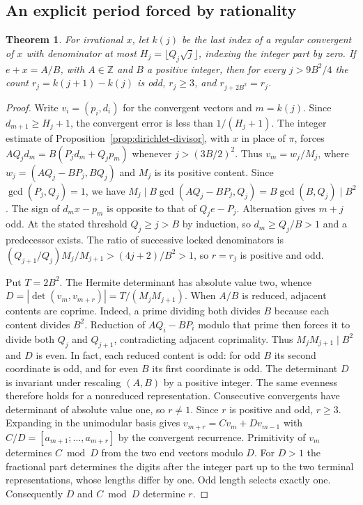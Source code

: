 \documentclass[11pt]{amsart}
\newtheorem{theorem}{Theorem}[section]
\theoremstyle{definition}
\theoremstyle{remark}
\numberwithin{equation}{section}
\begin{document}
\subsection{An explicit period forced by rationality}
\begin{theorem}\label{thm:explicit-period}
For irrational $x$, let $k(j)$ be the last index of a regular convergent of
$x$ with denominator at most $H_j=\lfloor Q_j\sqrt j\rfloor$, indexing the
integer part by zero. If $e+x=A/B$, with $A\in\mathbb Z$ and $B$ a positive
integer, then for every $j>9B^2/4$ the count $r_j=k(j+1)-k(j)$ is odd, $r_j\ge3$, and
$r_{j+2B^2}=r_j$.
\end{theorem}
\begin{proof}
Write $v_i=(p_i,d_i)$ for the convergent vectors and $m=k(j)$.
Since $d_{m+1}\ge H_j+1$, the convergent error is less than $1/(H_j+1)$.
The integer estimate of Proposition~\ref{prop:dirichlet-divisor}, with $x$ in place of $\pi$,
forces $A Q_j d_m=B(P_j d_m+Q_jp_m)$ whenever $j>(3B/2)^2$.
Thus $v_m=w_j/M_j$, where $w_j=(AQ_j-BP_j,BQ_j)$ and $M_j$ is its
positive content. Since $\gcd(P_j,Q_j)=1$, we have
$M_j\mid B\gcd(AQ_j-BP_j,Q_j)=B\gcd(B,Q_j)\mid B^2$.
The sign of $d_m x-p_m$ is opposite to that of $Q_j e-P_j$.
Alternation gives $m+j$ odd. At the stated threshold $Q_j\ge j>B$ by induction, so $d_m\ge Q_j/B>1$ and a predecessor exists. The ratio of successive locked denominators is $(Q_{j+1}/Q_j)M_j/M_{j+1}>(4j+2)/B^2>1$, so $r=r_j$ is positive and odd.

Put $T=2B^2$. The Hermite determinant has absolute value two, whence
$D=|\det(v_m,v_{m+r})|=T/(M_jM_{j+1})$.
When $A/B$ is reduced, adjacent contents are coprime. Indeed, a prime
dividing both divides $B$ because each content divides $B^2$.
Reduction of $AQ_i-BP_i$ modulo that prime then forces it to divide
both $Q_j$ and $Q_{j+1}$, contradicting adjacent coprimality.
Thus $M_jM_{j+1}\mid B^2$ and $D$ is even. In fact, each reduced
content is odd: for odd $B$ its second coordinate is odd, and
for even $B$ its first coordinate is odd.
The determinant $D$ is invariant under rescaling $(A,B)$ by a positive
integer. The same evenness therefore holds for a nonreduced representation.
Consecutive convergents have determinant of absolute value one, so
$r\ne1$. Since $r$ is positive and odd, $r\ge3$.
Expanding in the unimodular
basis gives $v_{m+r}=C v_m+D v_{m-1}$ with
$C/D=[a_{m+1};\ldots,a_{m+r}]$ by the convergent recurrence.
Primitivity of $v_m$ determines $C\bmod D$ from the two end vectors
modulo $D$. For $D>1$ the fractional part determines the digits after the
integer part up to the two terminal representations, whose lengths differ
by one. Odd length selects exactly one. Consequently $D$ and $C\bmod D$ determine $r$.


\end{proof}
\end{document}
